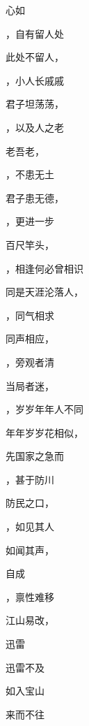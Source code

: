 \documentclass[12pt, a4paper, addpoints, answers]{exam}
\begin{document}
\begin{multicols}{2}
\begin{questions}
\question[2] 心如\fillin

\question[2] \fillin，自有留人处

\question[2] 此处不留人，\fillin

\question[2] \fillin，小人长戚戚

\question[2] 君子坦荡荡，\fillin

\question[2] \fillin，以及人之老

\question[2] 老吾老，\fillin

\question[2] \fillin，不患无土

\question[2] 君子患无德，\fillin

\question[2] \fillin，更进一步

\question[2] 百尺竿头，\fillin

\question[2] \fillin，相逢何必曾相识

\question[2] 同是天涯沦落人，\fillin

\question[2] \fillin，同气相求

\question[2] 同声相应，\fillin

\question[2] \fillin，旁观者清

\question[2] 当局者迷，\fillin

\question[2] \fillin，岁岁年年人不同

\question[2] 年年岁岁花相似，\fillin

\question[2] 

\question[2] 先国家之急而\fillin

\question[2] \fillin，甚于防川

\question[2] 防民之口，\fillin

\question[2] \fillin，如见其人

\question[2] 如闻其声，\fillin

\question[2] 

\question[2] 自成\fillin

\question[2] \fillin，禀性难移

\question[2] 江山易改，\fillin

\question[2] 

\question[2] 迅雷

\question[2] 迅雷不及\fillin

\question[2] 

\question[2] 如入宝山\fillin

\question[2] 

\question[2] 来而不往\fillin

\question[2] 


\end{questions}
\end{multicols}
\end{document}
